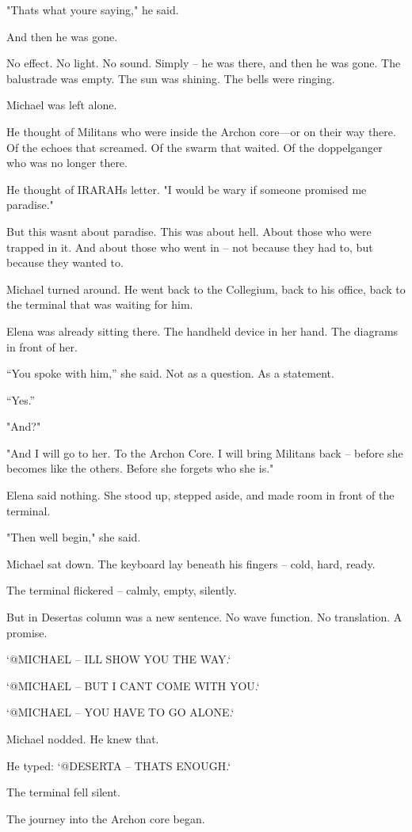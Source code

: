 \documentclass[
]{article}
\begin{document}
"That\textquotesingle s what you\textquotesingle re saying," he said.

And then he was gone.

No effect. No light. No sound. Simply -- he was there, and then he was gone. The balustrade was empty. The sun was shining. The bells were ringing.

Michael was left alone.

He thought of Militans who were inside the Archon core---or on their way there. Of the echoes that screamed. Of the swarm that waited. Of the doppelganger who was no longer there.

He thought of IRARAH\textquotesingle s letter. "I would be wary if someone promised me paradise."

But this wasn\textquotesingle t about paradise. This was about hell. About those who were trapped in it. And about those who went in -- not because they had to, but because they wanted to.

Michael turned around. He went back to the Collegium, back to his office, back to the terminal that was waiting for him.

Elena was already sitting there. The handheld device in her hand. The diagrams in front of her.

``You spoke with him,'' she said. Not as a question. As a statement.

``Yes.''

"And?"

"And I will go to her. To the Archon Core. I will bring Militans back -- before she becomes like the others. Before she forgets who she is."

Elena said nothing. She stood up, stepped aside, and made room in front of the terminal.

"Then we\textquotesingle ll begin," she said.

Michael sat down. The keyboard lay beneath his fingers -- cold, hard, ready.

The terminal flickered -- calmly, empty, silently.

But in Deserta\textquotesingle s column was a new sentence. No wave function. No translation. A promise.

`@MICHAEL -- I\textquotesingle LL SHOW YOU THE WAY.`

`@MICHAEL -- BUT I CAN\textquotesingle T COME WITH YOU.`

`@MICHAEL -- YOU HAVE TO GO ALONE.`

Michael nodded. He knew that.

He typed: `@DESERTA -- THAT\textquotesingle S ENOUGH.`

The terminal fell silent.

The journey into the Archon core began.
\end{document}
